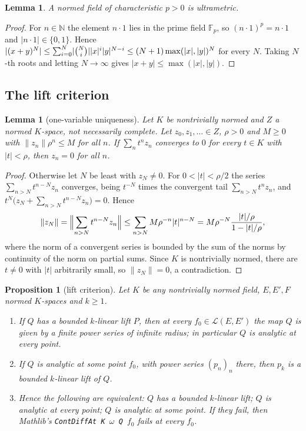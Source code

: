 \documentclass[11pt]{amsart}
\newtheorem{lemma}[theorem]{Lemma}
\newtheorem{proposition}[theorem]{Proposition}
\theoremstyle{definition}
\theoremstyle{remark}
\numberwithin{equation}{section}
\newcommand{\N}{\mathbb{N}}
\newcommand{\F}{\mathbb{F}}
\newcommand{\cL}{\mathcal{L}}
\newcommand{\abs}[1]{\lvert #1\rvert}
\newcommand{\norm}[1]{\lVert #1\rVert}
\begin{document}
\begin{lemma}\label{lem:ultra}
A normed field of characteristic $p>0$ is ultrametric.
\end{lemma}

\begin{proof}
For $n\in\N$ the element $n\cdot1$ lies in the prime field $\F_p$, so $(n\cdot1)^p=n\cdot1$ and
$\abs{n\cdot1}\in\{0,1\}$. Hence $\abs{(x+y)^N}\le\sum_{i=0}^N\abs{\tbinom Ni}\abs x^i\abs y^{N-i}\le(N+1)\max(\abs x,\abs
y)^N$ for every $N$. Taking $N$\nobreakdash-th roots and letting $N\to\infty$ gives $\abs{x+y}\le\max(\abs x,\abs y)$.
\end{proof}

\subsection{The lift criterion}

\begin{lemma}[one-variable uniqueness]\label{lem:unique}
Let $K$ be nontrivially normed and $Z$ a normed $K$\nobreakdash-space, not necessarily complete. Let $z_0,z_1,\dots\in Z$, $\rho>0$
and $M\ge0$ with $\norm{z_n}\rho^n\le M$ for all $n$. If $\sum_nt^nz_n$ converges to $0$ for every $t\in K$ with
$\abs t<\rho$, then $z_n=0$ for all $n$.
\end{lemma}

\begin{proof}
Otherwise let $N$ be least with $z_N\neq0$. For $0<\abs t<\rho/2$ the series $\sum_{n>N}t^{n-N}z_n$ converges, being
$t^{-N}$ times the convergent tail $\sum_{n>N}t^nz_n$, and $t^N\bigl(z_N+\sum_{n>N}t^{n-N}z_n\bigr)=0$. Hence
\[
\norm{z_N}=\Bigl\lVert\sum_{n>N}t^{n-N}z_n\Bigr\rVert\le\sum_{n>N}M\rho^{-n}\abs t^{n-N}
=M\rho^{-N}\frac{\abs t/\rho}{1-\abs t/\rho},
\]
where the norm of a convergent series is bounded by the sum of the norms by continuity of the norm on partial sums.
Since $K$ is nontrivially normed, there are $t\ne0$ with $\abs t$ arbitrarily small, so $\norm{z_N}=0$, a
contradiction.
\end{proof}

\begin{proposition}[lift criterion]\label{prop:lift}
Let $K$ be any nontrivially normed field, $E,E',F$ normed $K$\nobreakdash-spaces and $k\ge1$.
\begin{enumerate}
\item If $Q$ has a bounded $k$\nobreakdash-linear lift $P$, then at every $f_0\in\cL(E,E')$ the map $Q$ is given by a finite power
series of infinite radius; in particular $Q$ is analytic at every point.
\item If $Q$ is analytic at some point $f_0$, with power series $(p_n)_n$ there, then $p_k$ is a bounded $k$\nobreakdash-linear
lift of $Q$.
\item Hence the following are equivalent: $Q$ has a bounded $k$\nobreakdash-linear lift; $Q$ is analytic at every point; $Q$ is
analytic at some point. If they fail, then Mathlib's \texttt{ContDiffAt K $\omega$ Q $f_0$} fails at every $f_0$.
\end{enumerate}
\end{proposition}
\end{document}
